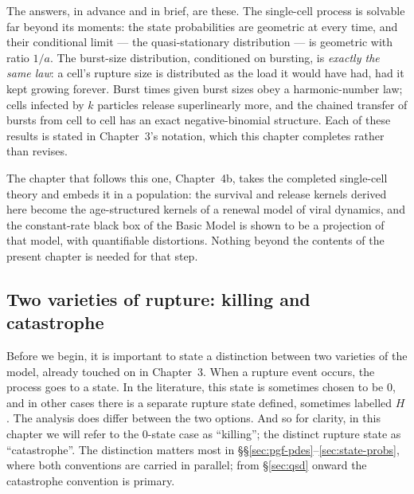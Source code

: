 The answers, in advance and in brief, are these. The single-cell process
is solvable far beyond its moments: the state probabilities are geometric
at every time, and their conditional limit --- the quasi-stationary
distribution --- is geometric with ratio $1/a$. The burst-size
distribution, conditioned on bursting, is \emph{exactly the same law}: a
cell's rupture size is distributed as the load it would have had, had it
kept growing forever. Burst times given burst sizes obey a harmonic-number
law; cells infected by $k$ particles release superlinearly more, and the
chained transfer of bursts from cell to cell has an exact negative-binomial
structure. Each of these results is stated in Chapter~3's notation, which
this chapter completes rather than revises.

The chapter that follows this one, Chapter~4b, takes the completed
single-cell theory and embeds it in a population: the survival and release
kernels derived here become the age-structured kernels of a renewal model
of viral dynamics, and the constant-rate black box of the Basic Model is
shown to be a projection of that model, with quantifiable distortions.
Nothing beyond the contents of the present chapter is needed for that
step.

\subsection{Two varieties of rupture: killing and catastrophe}
\label{sec:rupture-conventions}

Before we begin, it is important to state a distinction between two
varieties of the model, already touched on in Chapter~3. When a rupture
event occurs, the process goes to a state. In the literature, this state is
sometimes chosen to be $0$, and in other cases there is a separate rupture
state defined, sometimes labelled $H$. The analysis does differ between the
two options. And so for clarity, in this chapter we will refer to the
$0$-state case as ``killing''; the distinct rupture state as
``catastrophe''. The distinction matters most in
\S\S\ref{sec:pgf-pdes}--\ref{sec:state-probs}, where both conventions are
carried in parallel; from \S\ref{sec:qsd} onward the catastrophe
convention is primary.
